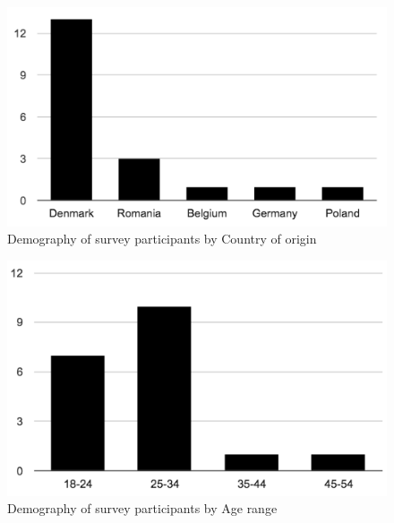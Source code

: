\documentclass{sigchi}
\begin{document}
\begin{figure}[h]
  \centering
  \includegraphics[width=\columnwidth]{figures/demography_country.png}
  \caption{Demography of survey participants by Country of origin}
  \label{fig:demography_country}
\end{figure}

\begin{figure}[h]
  \centering
  \includegraphics[width=\columnwidth]{figures/demography_age.png}
  \caption{Demography of survey participants by Age range}
  \label{fig:demography_age}
\end{figure}
\end{document}
